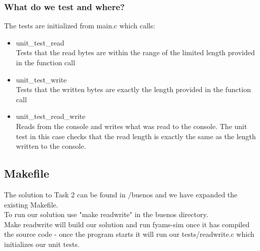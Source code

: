 \documentclass[a4paper,12pt,danish]{report}
\begin{document}
\subsubsection{What do we test and where?}
The tests are initialized from main.c which calls:
\\
\begin{itemize}
  \item{unit\_test\_read}
    \\
    Tests that the read bytes are within the range of the limited length provided in the function call
  \item{unit\_test\_write}
    \\
    Tests that the written bytes are exactly the length provided in the function call
  \item{unit\_test\_read\_write}
    \\
    Reads from the console and writes what was read to the console.
    The unit test in this case checks that the read length is exactly the same as the length written to the console.
\end{itemize}
\subsection{Makefile}
The solution to Task 2 can be found in /buenos and we have expanded the existing Makefile.
\\
To run our solution use "make readwrite" in the buenos directory.
\\
Make readwrite will build our solution and run fyams-sim once it has compiled the source code - once the program starts it will run our tests/readwrite.c which initializes our unit tests.
\end{document}
